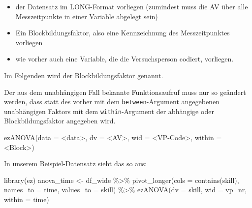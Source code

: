 \documentclass[
]{book}
\newenvironment{Shaded}{\begin{snugshade}}{\end{snugshade}}
\newcommand{\AttributeTok}[1]{\textcolor[rgb]{0.77,0.63,0.00}{#1}}
\newcommand{\FunctionTok}[1]{\textcolor[rgb]{0.00,0.00,0.00}{#1}}
\newcommand{\NormalTok}[1]{#1}
\newcommand{\OtherTok}[1]{\textcolor[rgb]{0.56,0.35,0.01}{#1}}
\newcommand{\SpecialCharTok}[1]{\textcolor[rgb]{0.00,0.00,0.00}{#1}}
\newcommand{\StringTok}[1]{\textcolor[rgb]{0.31,0.60,0.02}{#1}}
\providecommand{\tightlist}{%
  \setlength{\itemsep}{0pt}\setlength{\parskip}{0pt}}
\begin{document}
\begin{itemize}
\tightlist
\item
  der Datensatz im LONG-Format vorliegen (zumindest muss die AV über alle Messzeitpunkte in einer Variable abgelegt sein)
\item
  Ein Blockbildungsfaktor, also eine Kennzeichnung des Messzeitpunktes vorliegen
\item
  wie vorher auch eine Variable, die die Versuchsperson codiert, vorliegen.
\end{itemize}

Im Folgenden wird der Blockbildungsfaktor genannt.

Der aus dem unabhängigen Fall bekannte Funktionsaufruf muss nur so geändert werden, dass statt des vorher mit dem \texttt{between}-Argument angegebenen unabhängigen Faktors mit dem \texttt{within}-Argument der abhängige oder Blockbildungsfaktor angegeben wird.

\begin{Shaded}
\begin{Highlighting}[]
\FunctionTok{ezANOVA}\NormalTok{(}\AttributeTok{data =} \SpecialCharTok{\textless{}}\NormalTok{data}\SpecialCharTok{\textgreater{}}\NormalTok{, }
        \AttributeTok{dv =} \SpecialCharTok{\textless{}}\NormalTok{AV}\SpecialCharTok{\textgreater{}}\NormalTok{, }
        \AttributeTok{wid =} \SpecialCharTok{\textless{}}\NormalTok{VP}\SpecialCharTok{{-}}\NormalTok{Code}\SpecialCharTok{\textgreater{}}\NormalTok{,}
        \AttributeTok{within =} \SpecialCharTok{\textless{}}\NormalTok{Block}\SpecialCharTok{\textgreater{}}\NormalTok{)}
\end{Highlighting}
\end{Shaded}

In unserem Beispiel-Datensatz sieht das so aus:

\begin{Shaded}
\begin{Highlighting}[]
\FunctionTok{library}\NormalTok{(ez)}
\NormalTok{anova\_time }\OtherTok{\textless{}{-}} 
\NormalTok{  df\_wide }\SpecialCharTok{\%\textgreater{}\%} 
  \FunctionTok{pivot\_longer}\NormalTok{(}\AttributeTok{cols =} \FunctionTok{contains}\NormalTok{(}\StringTok{\textquotesingle{}skill\textquotesingle{}}\NormalTok{),}
               \AttributeTok{names\_to =} \StringTok{\textquotesingle{}time\textquotesingle{}}\NormalTok{,}
               \AttributeTok{values\_to =} \StringTok{\textquotesingle{}skill\textquotesingle{}}\NormalTok{) }\SpecialCharTok{\%\textgreater{}\%} 
  \FunctionTok{ezANOVA}\NormalTok{(}\AttributeTok{dv =}\NormalTok{ skill,}
          \AttributeTok{wid =}\NormalTok{ vp\_nr,}
          \AttributeTok{within =}\NormalTok{ time)}
\end{Highlighting}
\end{Shaded}
\end{document}
